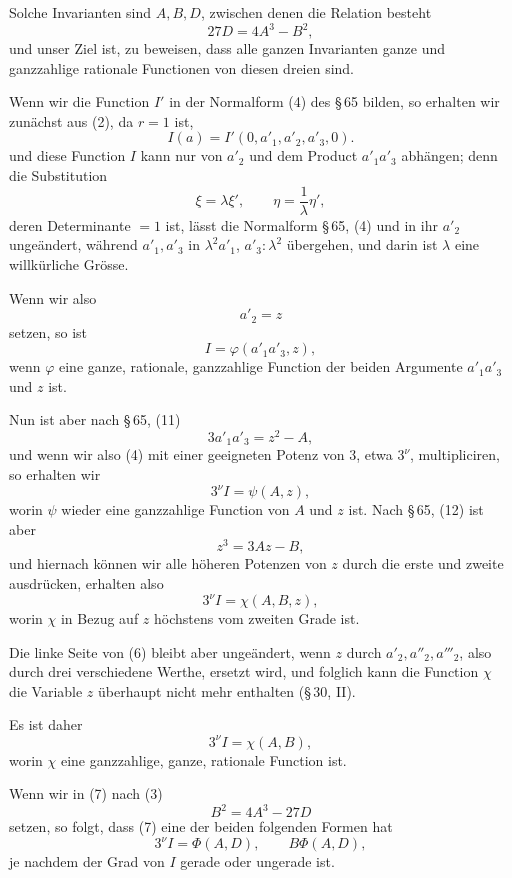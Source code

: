 \documentclass[11pt]{article}
\begin{document}
Solche Invarianten sind $A,B,D$, zwischen denen die Relation besteht
\begin{equation}
 27D=4A^3-B^2,
\tag{3}
\end{equation}
und unser Ziel ist, zu beweisen, dass alle ganzen Invarianten ganze und ganzzahlige rationale Functionen von diesen dreien sind.

Wenn wir die Function $I'$ in der Normalform (4) des \S\,65 bilden, so erhalten wir zunächst aus (2), da $r=1$ ist,
\[
 I(a)=I'(0,a'_1,a'_2,a'_3,0).
\]
und diese Function $I$ kann nur von $a'_2$ und dem Product $a'_1a'_3$ abhängen; denn die Substitution
\[
 \xi=\lambda\xi',
 \qquad
 \eta=\frac1\lambda\eta',
\]
deren Determinante $=1$ ist, lässt die Normalform \S\,65, (4) und in ihr $a'_2$ ungeändert, während $a'_1,a'_3$ in $\lambda^2a'_1$, $a'_3:\lambda^2$ übergehen, und darin ist $\lambda$ eine willkürliche Grösse.

Wenn wir also
\[
 a'_2=z
\]
setzen, so ist
\begin{equation}
 I=\varphi(a'_1a'_3,z),
\tag{4}
\end{equation}
wenn $\varphi$ eine ganze, rationale, ganzzahlige Function der beiden Argumente $a'_1a'_3$ und $z$ ist.

Nun ist aber nach \S\,65, (11)
\[
 3a'_1a'_3=z^2-A,
\]
und wenn wir also (4) mit einer geeigneten Potenz von $3$, etwa $3^\nu$, multipliciren, so erhalten wir
\begin{equation}
 3^\nu I=\psi(A,z),
\tag{5}
\end{equation}
worin $\psi$ wieder eine ganzzahlige Function von $A$ und $z$ ist. Nach \S\,65, (12) ist aber
\[
 z^3=3Az-B,
\]
und hiernach können wir alle höheren Potenzen von $z$ durch die erste und zweite ausdrücken, erhalten also
\begin{equation}
 3^\nu I=\chi(A,B,z),
\tag{6}
\end{equation}
worin $\chi$ in Bezug auf $z$ höchstens vom zweiten Grade ist.

Die linke Seite von (6) bleibt aber ungeändert, wenn $z$ durch $a'_2,a''_2,a'''_2$, also durch drei verschiedene Werthe, ersetzt wird, und folglich kann die Function $\chi$ die Variable $z$ überhaupt nicht mehr enthalten (\S\,30, II).

Es ist daher
\begin{equation}
 3^\nu I=\chi(A,B),
\tag{7}
\end{equation}
worin $\chi$ eine ganzzahlige, ganze, rationale Function ist.

Wenn wir in (7) nach (3)
\[
 B^2=4A^3-27D
\]
setzen, so folgt, dass (7) eine der beiden folgenden Formen hat
\begin{equation}
 3^\nu I=\Phi(A,D),
 \qquad
 B\Phi(A,D),
\tag{8}
\end{equation}
je nachdem der Grad von $I$ gerade oder ungerade ist.
\end{document}
